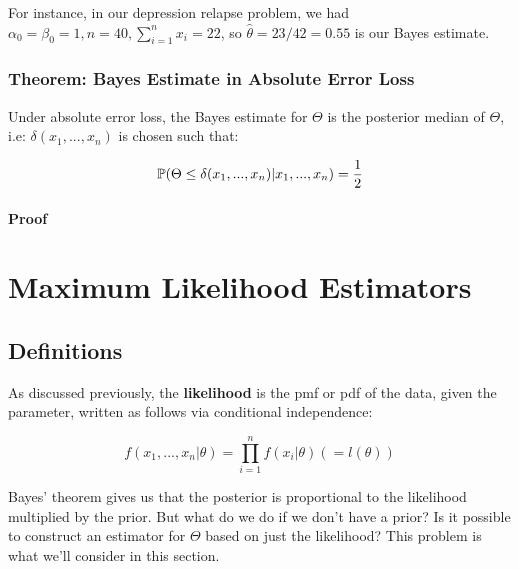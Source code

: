 \documentclass[a4paper]{article}
\begin{document}
                For instance, in our depression relapse problem, we had
                $\alpha_0 = \beta_0 = 1, n = 40, \sum\limits_{i=1}^n x_i = 22$,
                so $\widehat \theta = 23/42 = 0.55$ is our Bayes estimate.

            \subsubsection{Theorem: Bayes Estimate in Absolute Error Loss}
                Under absolute error loss, the Bayes estimate for $\Theta$ is
                the posterior median of $\Theta$, i.e: $\delta(x_1, ..., x_n)$
                is chosen such that:

                \[
                    \mathbb{P}(\Theta \leq \delta(x_1, ..., x_n) | x_1, ..., x_n) =
                    \frac{1}{2}
                \]

                \paragraph{Proof}
                    \begin{fread}
                        [DS12, theorem 4.5.3]
                    \end{fread}

    \newpage
    \section{Maximum Likelihood Estimators}
        \subsection{Definitions}
        As discussed previously, the \textbf{likelihood} is the pmf or pdf of
        the data, given the parameter, written as follows via conditional
        independence:

        \[
            f(x_1, ..., x_n | \theta) = \prod_{i=1}^n f(x_i | \theta)
            (=l(\theta))
        \]

        Bayes' theorem gives us that the posterior is proportional to the
        likelihood multiplied by the prior. But what do we do if we don't have a
        prior? Is it possible to construct an estimator for $\Theta$ based on
        just the likelihood? This problem is what we'll consider in this
        section.
\end{document}

